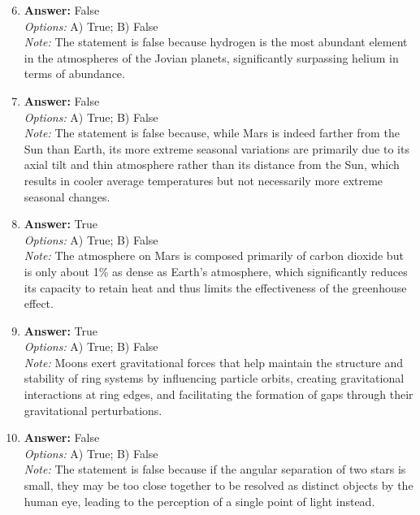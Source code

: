 \documentclass[12pt]{article}
\begin{document}
\begin{enumerate}[label=\arabic*.]
\setcounter{enumi}{5}
\item \textbf{Answer:} False
\\ \textit{Options:} A) True; B) False
\\ \textit{Note:} The statement is false because hydrogen is the most abundant element in the atmospheres of the Jovian planets, significantly surpassing helium in terms of abundance.
\item \textbf{Answer:} False
\\ \textit{Options:} A) True; B) False
\\ \textit{Note:} The statement is false because, while Mars is indeed farther from the Sun than Earth, its more extreme seasonal variations are primarily due to its axial tilt and thin atmosphere rather than its distance from the Sun, which results in cooler average temperatures but not necessarily more extreme seasonal changes.
\item \textbf{Answer:} True
\\ \textit{Options:} A) True; B) False
\\ \textit{Note:} The atmosphere on Mars is composed primarily of carbon dioxide but is only about 1\% as dense as Earth's atmosphere, which significantly reduces its capacity to retain heat and thus limits the effectiveness of the greenhouse effect.
\item \textbf{Answer:} True
\\ \textit{Options:} A) True; B) False
\\ \textit{Note:} Moons exert gravitational forces that help maintain the structure and stability of ring systems by influencing particle orbits, creating gravitational interactions at ring edges, and facilitating the formation of gaps through their gravitational perturbations.
\item \textbf{Answer:} False
\\ \textit{Options:} A) True; B) False
\\ \textit{Note:} The statement is false because if the angular separation of two stars is small, they may be too close together to be resolved as distinct objects by the human eye, leading to the perception of a single point of light instead.
\end{enumerate}
\end{document}
